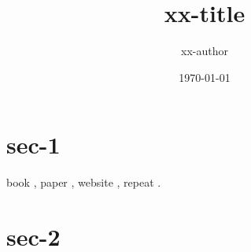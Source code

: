 \documentclass{article}
\title{xx-title}
\author{xx-author}
\date{\today}
\begin{document}
\maketitle

\tableofcontents

\section{sec-1}

book \cite{latexcompanion}, paper \cite{einstein}, website \cite{knuthwebsite}, repeat \cite{latexcompanion,knuthwebsite}.

\section{sec-2}

\lipsum[1]


\end{document}
